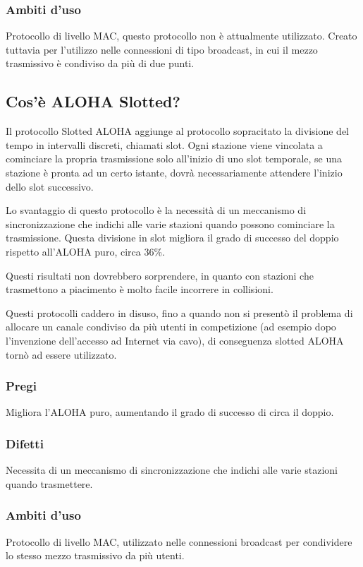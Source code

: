 \subsubsection{Ambiti d'uso}
Protocollo di livello MAC, questo protocollo non è attualmente utilizzato.
Creato tuttavia per l'utilizzo nelle connessioni di tipo broadcast, in cui il mezzo trasmissivo è condiviso da più di due punti.

\subsection{Cos'è ALOHA Slotted?}
Il protocollo Slotted ALOHA aggiunge al protocollo sopracitato la divisione del tempo in intervalli discreti, chiamati slot.
Ogni stazione viene vincolata a cominciare la propria trasmissione solo all’inizio di uno slot temporale,
se una stazione è pronta ad un certo istante, dovrà necessariamente attendere l’inizio dello slot successivo.

Lo svantaggio di questo protocollo è la necessità di un meccanismo di sincronizzazione che indichi alle varie stazioni quando possono cominciare la trasmissione.
Questa divisione in slot migliora il grado di successo del doppio rispetto all’ALOHA puro, circa 36\%.

Questi risultati non dovrebbero sorprendere, in quanto con stazioni che trasmettono a piacimento è molto facile incorrere in collisioni.

Questi protocolli caddero in disuso, fino a quando non si presentò il problema di allocare un canale condiviso da più utenti in competizione
(ad esempio dopo l’invenzione dell'accesso ad Internet via cavo), di conseguenza slotted ALOHA tornò ad essere utilizzato.

\subsubsection{Pregi}
Migliora l'ALOHA puro, aumentando il grado di successo di circa il doppio.

\subsubsection{Difetti}
Necessita di un meccanismo di sincronizzazione che indichi alle varie stazioni quando trasmettere.

\subsubsection{Ambiti d'uso}
Protocollo di livello MAC, utilizzato nelle connessioni broadcast per condividere lo stesso mezzo trasmissivo da più utenti.

